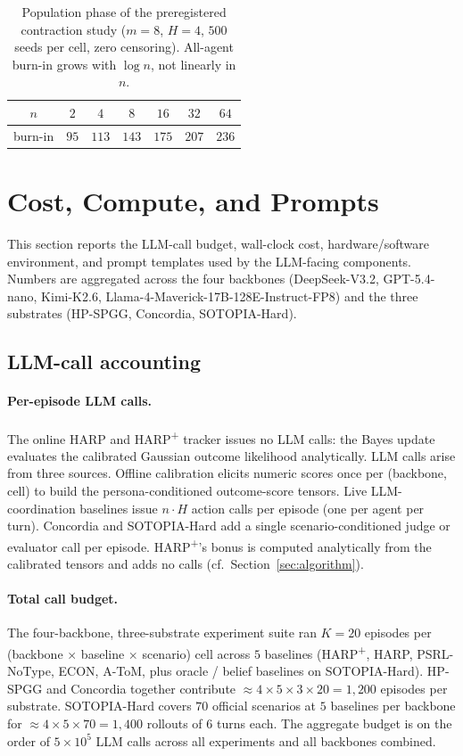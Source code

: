 \begin{table}[H]
\centering
\caption{Population phase of the preregistered contraction study ($m{=}8$, $H{=}4$, $500$ seeds per cell, zero censoring). All-agent burn-in grows with $\log n$, not linearly in $n$.}
\label{tab:contraction-population}
\begin{tabular}{ccccccc}
\toprule
$n$ & $2$ & $4$ & $8$ & $16$ & $32$ & $64$ \\
\midrule
burn-in & $95$ & $113$ & $143$ & $175$ & $207$ & $236$ \\
\bottomrule
\end{tabular}
\end{table}

\section{Cost, Compute, and Prompts}
\label{app:cost-compute}

This section reports the LLM-call budget, wall-clock cost, hardware/software environment, and prompt templates used by the LLM-facing components. Numbers are aggregated across the four backbones (DeepSeek-V3.2, GPT-5.4-nano, Kimi-K2.6, Llama-4-Maverick-17B-128E-Instruct-FP8) and the three substrates (HP-SPGG, Concordia, SOTOPIA-Hard).

\subsection{LLM-call accounting}
\label{app:cost-accounting}

\paragraph{Per-episode LLM calls.} The online HARP and HARP\textsuperscript{+} tracker issues no LLM calls: the Bayes update evaluates the calibrated Gaussian outcome likelihood analytically. LLM calls arise from three sources. Offline calibration elicits numeric scores once per (backbone, cell) to build the persona-conditioned outcome-score tensors. Live LLM-coordination baselines issue $n\cdot H$ action calls per episode (one per agent per turn). Concordia and SOTOPIA-Hard add a single scenario-conditioned judge or evaluator call per episode. HARP\textsuperscript{+}'s bonus is computed analytically from the calibrated tensors and adds no calls (cf.\ Section~\ref{sec:algorithm}).

\paragraph{Total call budget.} The four-backbone, three-substrate experiment suite ran $K{=}20$ episodes per (backbone $\times$ baseline $\times$ scenario) cell across $5$ baselines (HARP\textsuperscript{+}, HARP, PSRL-NoType, ECON, A-ToM, plus oracle / belief baselines on SOTOPIA-Hard). HP-SPGG and Concordia together contribute $\approx 4{\times}5{\times}3{\times}20 = 1{,}200$ episodes per substrate. SOTOPIA-Hard covers $70$ official scenarios at $5$ baselines per backbone for $\approx 4{\times}5{\times}70 = 1{,}400$ rollouts of $6$ turns each. The aggregate budget is on the order of $5{\times}10^5$ LLM calls across all experiments and all backbones combined.

